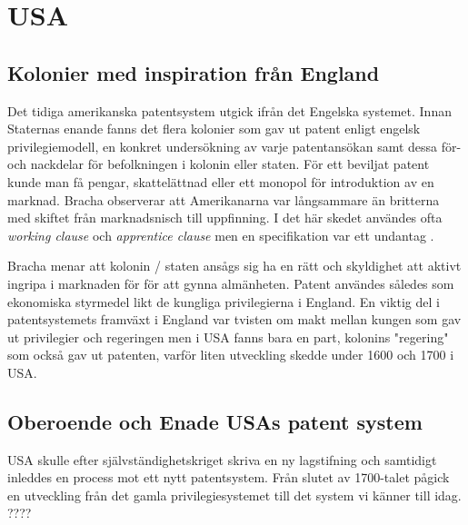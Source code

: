 \section{USA} 

\subsection{Kolonier med inspiration från England}

Det tidiga amerikanska patentsystem utgick ifrån det Engelska systemet. Innan Staternas enande fanns det
flera kolonier som gav ut patent enligt engelsk privilegiemodell, en konkret undersökning av varje
patentansökan samt dessa för- och nackdelar för befolkningen i kolonin eller staten. För ett beviljat
patent kunde man få pengar, skattelättnad eller ett monopol för introduktion av en marknad. Bracha
observerar att Amerikanarna var långsammare än britterna med skiftet från marknadsnisch till
uppfinning\cite{bracha}. I det här skedet användes ofta \emph{working clause} och \emph{apprentice
clause} men en specifikation var ett undantag \cite{bracha}.

Bracha menar att kolonin / staten ansågs sig ha en rätt och skyldighet att aktivt ingripa i marknaden
för för att gynna almänheten\cite{bracha}. Patent användes således som ekonomiska styrmedel likt de
kungliga privilegierna i England. En viktig del i patentsystemets framväxt i England var tvisten om makt
mellan kungen som gav ut privilegier och regeringen men i USA fanns bara en part, kolonins "regering"
som också gav ut patenten, varför liten utveckling skedde under 1600 och 1700 i USA.



\subsection{Oberoende och Enade USAs patent system}

USA skulle efter självständighetskriget skriva en ny lagstifning och samtidigt inleddes en process
mot ett nytt patentsystem. Från slutet av 1700-talet pågick en utveckling från det gamla privilegiesystemet till det system vi känner till idag.
????

